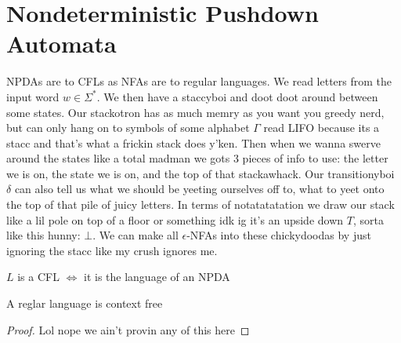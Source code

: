 \documentclass[10pt,a4paper]{article}
\begin{document}
\section{Nondeterministic Pushdown Automata}
NPDAs are to CFLs as NFAs are to regular languages. We read letters from the input word $w \in \Sigma^{\ast}$. We then have a staccyboi and doot doot around between some states. Our stackotron has as much memry as you want you greedy nerd, but can only hang on to symbols of some alphabet $\Gamma$ read LIFO because its a stacc and that's what a frickin stack does y'ken. Then when we wanna swerve around the states like a total madman we gots 3 pieces of info to use: the letter we is on, the state we is on, and the top of that stackawhack. Our transitionyboi $\delta$ can also tell us what we should be yeeting ourselves off to, what to yeet onto the top of that pile of juicy letters. In terms of notatatatation we draw our stack like a lil pole on top of a floor or something idk ig it's an upside down $T$, sorta like this hunny: $\bot$. We can make all $\epsilon$-NFAs into these chickydoodas by just ignoring the stacc like my crush ignores me.
\begin{theorem}
$L$ is a CFL $\iff$ it is the language of an NPDA
\end{theorem}
\begin{corollary}
A reglar language is context free
\end{corollary}
\begin{proof}
Lol nope we ain't provin any of this here
\end{proof}
\end{document}
